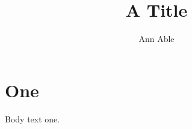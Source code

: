 \documentclass{ecls}
\title{A Title}\author{Ann Able}
\begin{document}
\maketitle
\section{One}
Body text one.
\end{document}
